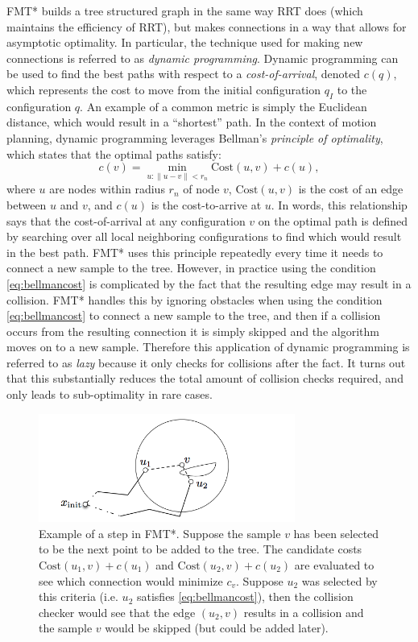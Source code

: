 FMT* builds a tree structured graph in the same way RRT does (which maintains the efficiency of RRT), but makes connections in a way that allows for asymptotic optimality. In particular, the technique used for making new connections is referred to as \textit{dynamic programming}. Dynamic programming can be used to find the best paths with respect to a \textit{cost-of-arrival}, denoted $c(q)$, which represents the cost to move from the initial configuration $q_I$ to the configuration $q$. An example of a common metric is simply the Euclidean distance, which would result in a ``shortest'' path. In the context of motion planning, dynamic programming leverages Bellman's \textit{principle of optimality}, which states that the optimal paths satisfy:
\begin{equation}
\label{eq:bellmancost}
c(v) = \min_{u:\lVert u - v\rVert < r_n} \text{Cost}(u, v) + c(u),
\end{equation}
where $u$ are nodes within radius $r_n$ of node $v$, $\text{Cost}(u, v)$ is the cost of an edge between $u$ and $v$, and $c(u)$ is the cost-to-arrive at $u$. In words, this relationship says that the cost-of-arrival at any configuration $v$ on the optimal path is defined by searching over all local neighboring configurations to find which would result in the best path. FMT* uses this principle repeatedly every time it needs to connect a new sample to the tree.
However, in practice using the condition \eqref{eq:bellmancost} is complicated by the fact that the resulting edge may result in a collision. FMT* handles this by ignoring obstacles when using the condition \eqref{eq:bellmancost} to connect a new sample to the tree, and then if a collision occurs from the resulting connection it is simply skipped and the algorithm moves on to a new sample. Therefore this application of dynamic programming is referred to as \textit{lazy} because it only checks for collisions after the fact. It turns out that this substantially reduces the total amount of collision checks required, and only leads to sub-optimality in rare cases.


\begin{figure}[ht]
  \centering
  \includegraphics[width=0.75\textwidth]{tex/figs/ch06_figs/fmt.png}
  \caption{Example of a step in FMT*. Suppose the sample $v$ has been selected to be the next point to be added to the tree. The candidate costs $\text{Cost}(u_1, v) + c(u_1)$ and $\text{Cost}(u_2, v) + c(u_2)$ are evaluated to see which connection would minimize $c_v$. Suppose $u_2$ was selected by this criteria (i.e. $u_2$ satisfies \eqref{eq:bellmancost}), then the collision checker would see that the edge $(u_2,v)$ results in a collision and the sample $v$ would be skipped (but could be added later).}
  \label{fig:plot_idea}
\end{figure}

